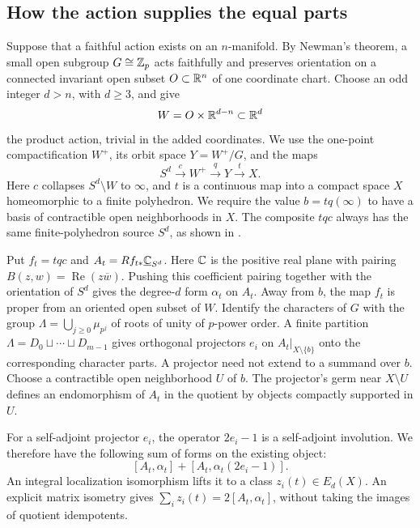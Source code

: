 \subsection{How the action supplies the equal parts}

Suppose that a faithful action exists on an \(n\)-manifold. By Newman's
theorem, a small open subgroup \(G\cong\mathbb Z_p\) acts faithfully and
preserves orientation on a connected invariant open subset
\(O\subset\mathbb R^n\) of one coordinate chart. Choose an odd integer
\(d>n\), with \(d\geq3\), and give
\[
 W=O\times\mathbb R^{d-n}\subset\mathbb R^d
\]
the product action, trivial in the added coordinates. We use the
one-point compactification \(W^+\), its orbit space \(Y=W^+/G\),
and the maps
\[
 S^d\xrightarrow{c}W^+\xrightarrow{q}Y\xrightarrow{t}X.
\]
Here \(c\) collapses \(S^d\setminus W\) to \(\infty\), and \(t\)
is a continuous map into a compact space \(X\) homeomorphic to a finite
polyhedron. We require the value
\(b=tq(\infty)\) to have a basis of contractible open neighborhoods
in \(X\). The composite \(tqc\) always has the same finite-polyhedron
source \(S^d\), as shown in .



Put \(f_t=tqc\) and \(A_t=Rf_{t*}\underline{\mathbb C}_{S^d}\).
Here \(\mathbb C\) is the positive real plane with pairing
\(B(z,w)=\operatorname{Re}(z\overline w)\). Pushing this coefficient
pairing together with the orientation of \(S^d\) gives the degree-\(d\)
form \(\alpha_t\) on \(A_t\).
Away from \(b\), the map \(f_t\) is proper from an oriented open
subset of \(W\). Identify the characters of \(G\) with the group
\(\Lambda=\bigcup_{j\geq0}\mu_{p^j}\) of roots of unity of $p$-power
order. A finite partition \(\Lambda=D_0\sqcup\cdots\sqcup D_{m-1}\)
gives orthogonal projectors \(e_i\) on
\(A_t|_{X\setminus\{b\}}\) onto the corresponding character parts.
A projector need not extend to a summand over \(b\). Choose a
contractible open neighborhood \(U\) of \(b\). The projector's germ near
\(X\setminus U\) defines an endomorphism of \(A_t\) in the quotient
by objects compactly supported in \(U\).

For a self-adjoint projector \(e_i\), the operator \(2e_i-1\) is a
self-adjoint involution. We therefore have the following sum of forms
on the existing object:
\[
 [A_t,\alpha_t]+[A_t,\alpha_t(2e_i-1)].
\]
An integral localization
isomorphism lifts it to a class \(z_i(t)\in E_d(X)\). An explicit
matrix isometry gives
\(\sum_i z_i(t)=2[A_t,\alpha_t]\), without taking the images of
quotient idempotents.

